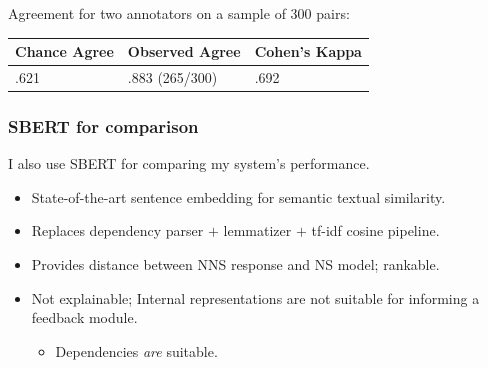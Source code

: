 \documentclass[handout,xcolor={dvipsnames}]{beamer}
\newcommand{\param}[1]{\texttt{#1}}
\begin{document}
\begin{frame}
\pause
Agreement for two annotators on a sample of 300 pairs: \\

\begin{table}[htb!]
\begin{center}
\begin{tabular}{|l|l|l|}
\hline
 Chance Agree & Observed Agree & Cohen's Kappa \\
\hline
.621 & .883 (265/300) & .692 \\
\hline
\end{tabular}
\end{center}
\end{table}


\end{frame}

\begin{frame}
\frametitle{SBERT for comparison}
I also use SBERT for comparing my system's performance.
\vspace{.3em}
\begin{itemize}
\pause
\item State-of-the-art sentence embedding for semantic textual similarity.
\vspace{.3em}
\pause
\item Replaces dependency parser $+$ lemmatizer $+$ tf-idf cosine pipeline. 
\vspace{.3em}
\pause
\item Provides distance between NNS response and NS model; rankable.
\vspace{.3em}
\pause
\item Not explainable; Internal representations are not suitable for informing a feedback module.
\begin{itemize}
\vspace{.3em}
\pause
\item Dependencies \textit{are} suitable.
\end{itemize}
\end{itemize}
\end{frame}
\end{document}
